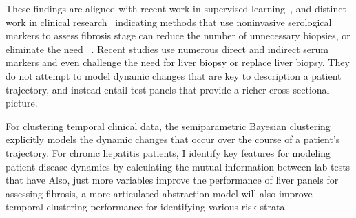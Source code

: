  These findings are aligned with recent work in supervised learning~\cite{Jiang2006}, and distinct work in clinical research~\cite{Parkes2011} indicating methods that use noninvasive serological markers to assess fibrosis stage can reduce the number of unnecessary biopsies, or eliminate the need ~\cite{Gangadharan}.  Recent studies use numerous direct and indirect serum markers and even challenge the need for liver biopsy  or replace liver biopsy.  They do not attempt to model dynamic changes that are key to description  a patient trajectory, and instead entail test panels that provide a richer cross-sectional picture.

 For clustering temporal clinical data, the semiparametric Bayesian clustering explicitly models the dynamic changes that occur over the course of a patient's trajectory.  For chronic hepatitis patients, I identify key features for modeling patient disease dynamics by calculating the mutual information between lab tests that have Also, just more variables improve the performance of liver panels for assessing fibrosis, a more articulated abstraction model will also improve temporal clustering performance for identifying various risk strata.
